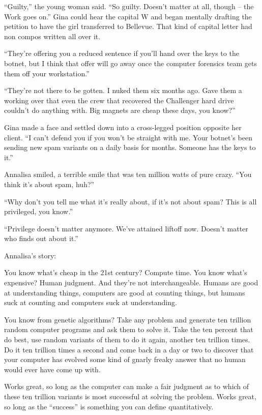 “Guilty,” the young woman said. “So guilty. Doesn't matter at 
all, though -- the Work goes on.” Gina could hear the capital W and 
began mentally drafting the petition to have the girl transferred to 
Bellevue. That kind of capital letter had non compos written all over 
it.

“They're offering you a reduced sentence if you'll hand over the keys 
to the botnet, but I think that offer will go away once the computer 
forensics team gets them off your workstation.”

“They're not there to be gotten. I nuked them six months ago. Gave 
them a working over that even the crew that recovered the Challenger 
hard drive couldn't do anything with. Big magnets are cheap these days, 
you know?”

Gina made a face and settled down into a cross-legged position opposite 
her client. “I can't defend you if you won't be straight with me. 
Your botnet's been sending new spam variants on a daily basis for 
months. Someone has the keys to it.”

Annalisa smiled, a terrible smile that was ten million watts of pure 
crazy. “You think it's about spam, huh?”

“Why don't you tell me what it's really about, if it's not about 
spam? This is all privileged, you know.”

“Privilege doesn't matter anymore. We've attained liftoff now. 
Doesn't matter who finds out about it.”

\tb

Annalisa's story:

You know what's cheap in the 21st century? Compute time. You know 
what's expensive? Human judgment. And they're not interchangeable. 
Humans are good at understanding things, computers are good at counting 
things, but humans suck at counting and computers suck at understanding.

You know from genetic algorithms? Take any problem and generate ten 
trillion random computer programs and ask them to solve it. Take the 
ten percent that do best, use random variants of them to do it again, 
another ten trillion times. Do it ten trillion times a second and come 
back in a day or two to discover that your computer has evolved some 
kind of gnarly freaky answer that no human would ever have come up with.

Works great, so long as the computer can make a fair judgment as to 
which of these ten trillion variants is most successful at solving the 
problem. Works great, so long as the “success” is something you can 
define quantitatively.

